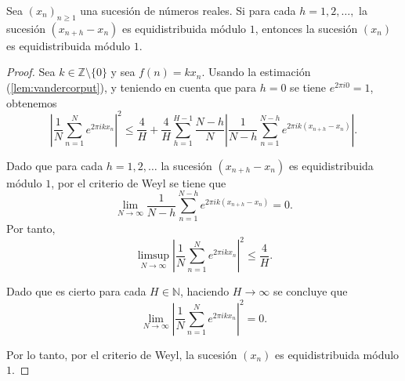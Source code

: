 \begin{theorem}
    \label{teo:diferencias_weyl}
    Sea $(x_n)_{n\geq1}$ una sucesión de números reales. Si para cada $h=1,2,\dots,$
    la sucesión $(x_{n+h}-x_n)$ es equidistribuida módulo $1$, entonces la sucesión
    $(x_n)$ es equidistribuida módulo $1$.
\end{theorem}

\begin{proof}
    Sea $k\in \mathbb{Z}\setminus\{0\}$ y sea $f(n)=kx_n$. Usando la estimación 
    (\ref{lem:vandercorput}), y teniendo en cuenta que para $h=0$ se tiene $e^{2\pi i 0}=1$, obtenemos
    \[
        \left|\frac{1}{N}\sum_{n=1}^N e^{2\pi i k x_n}\right|^2 \leq
        \frac{4}{H} + \frac{4}{H} \sum_{h=1}^{H-1} \frac{N-h}{N} \left|\frac{1}{N-h}\sum_{n=1}^{N-h} e^{2\pi i k (x_{n+h}-x_n)} \right|.
    \]

    Dado que para cada $h=1,2,\dots$ la sucesión $(x_{n+h}-x_n)$ es equidistribuida módulo $1$,
    por el criterio de Weyl se tiene que
    \[
        \lim_{N\to\infty} \frac{1}{N-h}\sum_{n=1}^{N-h} e^{2\pi i k (x_{n+h}-x_n)} = 0.
    \]
    Por tanto,
    \[
        \limsup_{N\to\infty} \left|\frac{1}{N}\sum_{n=1}^N e^{2\pi i k x_n}\right|^2 \leq \frac{4}{H}.
    \]
    
    Dado que es cierto para cada $H\in \mathbb{N}$, haciendo $H\to\infty$ se concluye que
    \[
        \lim_{N\to\infty} \left|\frac{1}{N}\sum_{n=1}^N e^{2\pi i k x_n}\right|^2 = 0.
    \]

    Por lo tanto, por el criterio de Weyl, la sucesión $(x_n)$ es equidistribuida módulo $1$.
\end{proof}
    